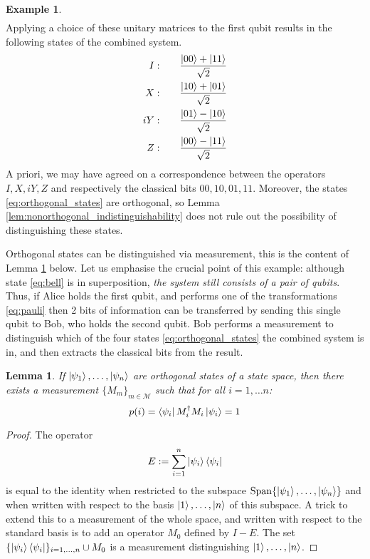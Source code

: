 \documentclass[12pt]{article}
\theoremstyle{plain}
\newtheorem{lemma}[thm]{Lemma}
\theoremstyle{definition}
\newtheorem{example}[thm]{Example}
\newcommand{\call}[1]{\mathcal{#1}}
\begin{document}
\begin{example}
\begin{align*}
		\end{align*}
		Applying a choice of these unitary matrices to the first qubit results in the following states of the combined system.
		\begin{align}\label{eq:orthogonal_states}
			\begin{split}
			I:\qquad & \frac{\ket{00} + \ket{11}}{\sqrt{2}}\\
			X:\qquad & \frac{\ket{10} + \ket{01}}{\sqrt{2}}\\
			iY:\qquad & \frac{\ket{01} - \ket{10}}{\sqrt{2}}\\
			Z:\qquad & \frac{\ket{00} - \ket{11}}{\sqrt{2}}
			\end{split}
		\end{align}
		A priori, we may have agreed on a correspondence between the operators $I,X, iY, Z$ and respectively the classical bits $00, 10, 01, 11$. Moreover, the states \eqref{eq:orthogonal_states} are orthogonal, so Lemma \ref{lem:nonorthogonal_indistinguishability} does not rule out the possibility of distinguishing these states.
		
		Orthogonal states can be distinguished via measurement, this is the content of Lemma \ref{lem:orthogonal_distinguishability} below. Let us emphasise the crucial point of this example: although state \eqref{eq:bell} is in superposition, \emph{the system still consists of a pair of qubits}. Thus, if Alice holds the first qubit, and performs one of the transformations \eqref{eq:pauli} then 2 bits of information can be transferred by sending this single qubit to Bob, who holds the second qubit. Bob performs a measurement to distinguish which of the four states \eqref{eq:orthogonal_states} the combined system is in, and then extracts the classical bits from the result.
		\end{example}
	\begin{lemma}\label{lem:orthogonal_distinguishability}
		If $\ket{\psi_1},\ldots, \ket{\psi_n}$ are orthogonal states of a state space, then there exists a measurement $\{ M_m \}_{m \in \call{M}}$ such that for all $i = 1,\ldots n$:
		\begin{equation}
			p(i) = \bra{\psi_i}M_i^\dagger M_i \ket{\psi_i} = 1
			\end{equation}
		\end{lemma}
	\begin{proof}
		The operator
		\begin{equation}
			E := \sum_{i = 1}^n \ket{\psi_i}\bra{\psi_i}
			\end{equation}
		is equal to the identity when restricted to the subspace $\operatorname{Span}\{ \ket{\psi_1},\ldots, \ket{\psi_n} \}$ and when written with respect to the basis $\ket{1},\ldots, \ket{n}$ of this subspace. A trick to extend this to a measurement of the whole space, and written with respect to the standard basis is to add an operator $M_0$ defined by $I - E$. The set $\{ \ket{\psi_i}\bra{\psi_i} \}_{i = 1,\ldots, n}\cup M_0$ is a measurement distinguishing $\ket{1},\ldots, \ket{n}$.
		\end{proof}
	
\end{document}
